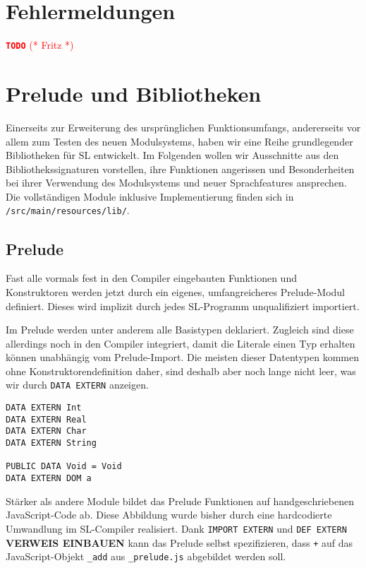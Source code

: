 \documentclass[runningheads]{llncs}
\newcommand{\TODO}[1]{ \textcolor{red}{\textbf{\texttt{\large{TODO}}} (* #1 *)}\par}
\begin{document}
\section{Fehlermeldungen}
\label{sec:errors}
\TODO{Fritz}

\section{Prelude und Bibliotheken}
\label{sec:libs}

Einerseits zur Erweiterung des ursprünglichen Funktionsumfangs, andererseits
vor allem zum Testen des neuen Modulsystems, haben wir eine Reihe grundlegender
Bibliotheken für SL entwickelt. Im Folgenden wollen wir Ausschnitte aus den
Bibliothekssignaturen vorstellen, ihre Funktionen angerissen und
Besonderheiten bei ihrer Verwendung des Modulsystems und neuer Sprachfeatures
ansprechen. Die vollständigen Module inklusive Implementierung finden sich
in \verb|/src/main/resources/lib/|.

\subsection{Prelude}
\label{sec:libsPrelude}

Fast alle vormals fest in den Compiler eingebauten Funktionen und Konstruktoren
werden jetzt durch ein eigenes, umfangreicheres Prelude-Modul definiert.
Dieses wird implizit durch jedes SL-Programm unqualifiziert importiert.

Im Prelude werden unter anderem alle Basistypen deklariert. Zugleich sind
diese allerdings noch in den Compiler integriert, damit die Literale einen
Typ erhalten können unabhängig vom Prelude-Import. Die meisten dieser
Datentypen kommen ohne Konstruktorendefinition daher, sind deshalb aber noch
lange nicht leer, was wir durch \verb|DATA EXTERN| anzeigen.

\begin{verbatim}
DATA EXTERN Int
DATA EXTERN Real
DATA EXTERN Char
DATA EXTERN String

PUBLIC DATA Void = Void
DATA EXTERN DOM a
\end{verbatim}

Stärker als andere Module bildet das Prelude Funktionen auf handgeschriebenen
JavaScript-Code ab. Diese Abbildung wurde bisher durch eine hardcodierte
Umwandlung im SL-Compiler realisiert. Dank \verb|IMPORT EXTERN| und
\verb|DEF EXTERN| \textbf{VERWEIS EINBAUEN} kann das Prelude selbst
spezifizieren, dass \verb|+| auf das JavaScript-Objekt \verb|_add|
aus \verb|_prelude.js| abgebildet werden soll.
\end{document}
